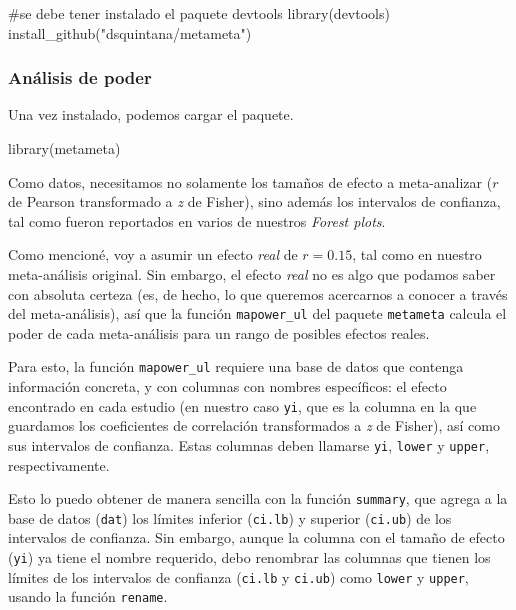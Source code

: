 \documentclass[
  bookmarksnumbered]{article}
\newenvironment{Shaded}{\begin{snugshade}}{\end{snugshade}}
\newcommand{\CommentTok}[1]{\textcolor[rgb]{0.54,0.53,0.53}{#1}}
\newcommand{\FunctionTok}[1]{\textcolor[rgb]{0.39,0.29,0.61}{#1}}
\newcommand{\NormalTok}[1]{\textcolor[rgb]{0.12,0.11,0.11}{#1}}
\newcommand{\StringTok}[1]{\textcolor[rgb]{0.75,0.01,0.01}{#1}}
\begin{document}
\begin{Shaded}
\begin{Highlighting}[]
\CommentTok{\#se debe tener instalado el paquete devtools}
\FunctionTok{library}\NormalTok{(devtools)}
\FunctionTok{install\_github}\NormalTok{(}\StringTok{"dsquintana/metameta"}\NormalTok{)}
\end{Highlighting}
\end{Shaded}

\hypertarget{anuxe1lisis-de-poder}{%
\subsubsection{Análisis de poder}\label{anuxe1lisis-de-poder}}

Una vez instalado, podemos cargar el paquete.

\begin{Shaded}
\begin{Highlighting}[]
\FunctionTok{library}\NormalTok{(metameta)}
\end{Highlighting}
\end{Shaded}

Como datos, necesitamos no solamente los tamaños de efecto a meta-analizar (\(r\) de Pearson transformado a \emph{z} de Fisher), sino además los intervalos de confianza, tal como fueron reportados en varios de nuestros \emph{Forest plots}.

Como mencioné, voy a asumir un efecto \emph{real} de \(r = 0.15\), tal como en nuestro meta-análisis original. Sin embargo, el efecto \emph{real} no es algo que podamos saber con absoluta certeza (es, de hecho, lo que queremos acercarnos a conocer a través del meta-análisis), así que la función \texttt{mapower\_ul} del paquete \texttt{metameta} calcula el poder de cada meta-análisis para un rango de posibles efectos reales.

Para esto, la función \texttt{mapower\_ul} requiere una base de datos que contenga información concreta, y con columnas con nombres específicos: el efecto encontrado en cada estudio (en nuestro caso \texttt{yi}, que es la columna en la que guardamos los coeficientes de correlación transformados a \emph{z} de Fisher), así como sus intervalos de confianza. Estas columnas deben llamarse \texttt{yi}, \texttt{lower} y \texttt{upper}, respectivamente.

Esto lo puedo obtener de manera sencilla con la función \texttt{summary}, que agrega a la base de datos (\texttt{dat}) los límites inferior (\texttt{ci.lb}) y superior (\texttt{ci.ub}) de los intervalos de confianza. Sin embargo, aunque la columna con el tamaño de efecto (\texttt{yi}) ya tiene el nombre requerido, debo renombrar las columnas que tienen los límites de los intervalos de confianza (\texttt{ci.lb} y \texttt{ci.ub}) como \texttt{lower} y \texttt{upper}, usando la función \texttt{rename}.
\end{document}
